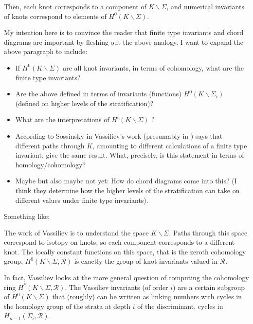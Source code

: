 \documentclass[12pt]{report}
\theoremstyle{regular}
\newcommand{\draftnote}[1]{
\begin{mdframed}[style=draftnote]
        {\color{Gray}{\scshape Note:} #1 }
\end{mdframed}
}
\begin{document}
        Then, each knot corresponds to a component of \(K \smallsetminus \Sigma\), and numerical invariants of knots correspond to elements of \(H^{0}(K \smallsetminus \Sigma)\).
        \draftnote{
                My intention here is to convince the reader that finite type invariants and chord diagrams are important by fleshing out the above analogy. I want to expand the above paragraph to include:
                \begin{itemize}
                        \item If \(H^{0}(K \smallsetminus \Sigma)\) are all knot invariants, in terms of cohomology, what are the finite type invariants?
                        \item Are the above defined in terms of invariants (functions) \(H^{0}(K \smallsetminus \Sigma_{i})\) (defined on higher levels of the stratification)?
                        \item What are the interpretations of \(H^{i}(K \smallsetminus \Sigma)\) \cite[p.149]{complements-of-discriminants-of-smooth-maps-topology-and-applications}?
                        \item According to Sossinsky in \cite[p. 49]{knots-mathematics-with-a-twist} Vassiliev's work (presumably in \cite{complements-of-discriminants-of-smooth-maps-topology-and-applications, cohomology-of-knot-spaces}) says that different paths through \(K\), amounting to different calculations of a finite type invariant, give the same result. What, precisely, is this statement in terms of homology/cohomology?
                        \item Maybe but also maybe not yet: How do chord diagrams come into this? (I think they determine how the higher levels of the stratification can take on different values under finite type invariants).
                \end{itemize}

                Something like:
        }

        The work of Vassiliev is to understand the space \(K \smallsetminus \Sigma\). Paths through this space correspond to isotopy on knots, so each component corresponds to a different knot. The locally constant functions on this space, that is the zeroth cohomology group, \(H^{0}(K \smallsetminus \Sigma, \mathcal{R})\) is exactly the group of knot invariants valued in \(\mathcal{R}\).

        In fact, Vassiliev looks at the more general question of computing the cohomology ring \(H^{\ast}(K \smallsetminus \Sigma, \mathcal{R})\). The Vassiliev invariants (of order \(i\)) are a certain subgroup of \(H^{0}(K \smallsetminus \Sigma)\) that (roughly) can be written as linking numbers with cycles in the homology group of the strata at depth \(i\) of the discriminant, cycles in \(H_{n - 1}(\Sigma_{i}, \mathcal{R})\).
\end{document}

